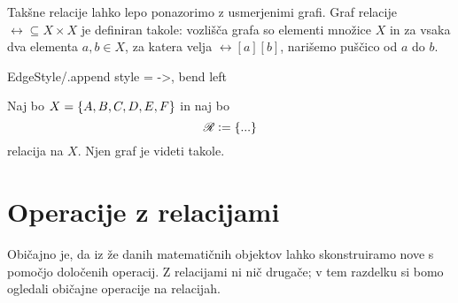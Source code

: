                 Takšne relacije lahko lepo ponazorimo z usmerjenimi grafi. Graf relacije $\rel \subseteq X \times X$ je definiran takole: vozlišča grafa so elementi množice $X$ in za vsaka dva elementa $a, b \in X$, za katera velja $\rel[a][b]$, narišemo puščico od $a$ do $b$.

                \GraphInit[vstyle = Normal]
                \tikzset
                {
                        EdgeStyle/.append style = {->, bend left}
                }

                \begin{zgled}\label{zgled:graf-relacije}
                        Naj bo $X = \set{A, B, C, D, E, F}$ in naj bo
                        \[\rel \dfeq \set{...}\]
                        relacija na $X$. Njen graf je videti takole.

                \end{zgled}


        \section{Operacije z relacijami}\label{razdelek:operacije-z-relacijami}

                Običajno je, da iz že danih matematičnih objektov lahko skonstruiramo nove s pomočjo določenih operacij. Z relacijami ni nič drugače; v tem razdelku si bomo ogledali običajne operacije na relacijah.

